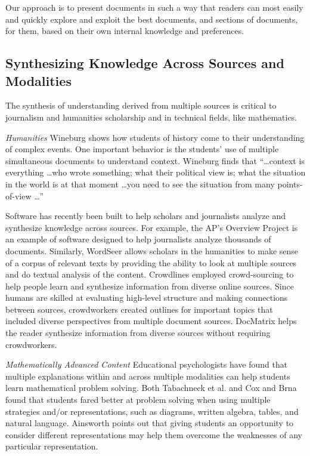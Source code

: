 Our approach is to present documents in such a way that readers can most easily and quickly explore and exploit the best documents, and sections of documents, for them, based on their own internal knowledge and preferences.  



\subsection{Synthesizing Knowledge Across Sources and Modalities}

The synthesis of understanding derived from multiple sources is critical to journalism and humanities scholarship and in technical fields, like mathematics.

\textit{Humanities}  \hspace{2 mm}
Wineburg \cite{wineburg} shows how students of history come to their understanding of complex events. One important behavior is the students' use of multiple simultaneous documents to understand context. Wineburg finds that ``\ldots context is everything \ldots who wrote something; what their political view is; what the situation in the world is at that moment \ldots you need to see the situation from many points-of-view \ldots''

Software has recently been built to help scholars and journalists analyze and synthesize knowledge across sources. For example, the AP's Overview Project \cite{overview} is an example of software designed to help journalists analyze thousands of documents. Similarly, WordSeer \cite{wordseer} allows scholars in the humanities to make sense of a corpus of relevant texts by providing the ability to look at multiple sources and do textual analysis of the content. Crowdlines \cite{luther} employed crowd-sourcing to help people learn and synthesize information from diverse online sources. Since humans are skilled at evaluating high-level structure and making connections between sources, crowdworkers created outlines for important topics that included diverse perspectives from multiple document sources. DocMatrix helps the reader synthesize information from diverse sources without requiring crowdworkers. 

\textit{Mathematically Advanced Content}  \hspace{2 mm}
Educational psychologists have found that multiple explanations within and across multiple modalities can help students learn mathematical problem solving. Both Tabachneck et al. \cite{Tabachneck} and Cox and Brna \cite{cox} found that students fared better at problem solving when using multiple strategies and/or representations, such as diagrams, written algebra, tables, and natural language. Ainsworth points out that giving students an opportunity to consider different representations may help them overcome the weaknesses of any particular representation.

